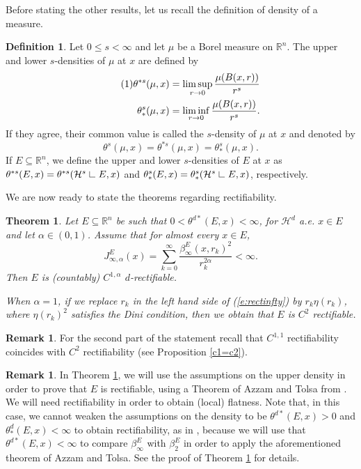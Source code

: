 \documentclass[11pt, twoside, leqno]{article}
\numberwithin{equation}{section}
\newcommand\numberthis{\addtocounter{equation}{1}\tag{\theequation}}
\theoremstyle{plain}
\newtheorem{thmz}{Theorem}
\theoremstyle{definition}
\newtheorem{rk}[thm]{Remark}
\newtheorem{defin}[thm]{Definition}
\newcommand{\R}{\mathbb{R}}
\newcommand{\res}{\hbox{ {\vrule height .22cm}{\leaders\hrule\hskip.2cm} }} %
\begin{document}
Before stating the other results, let us recall the definition of density of a measure. 
\begin{defin}
Let $0 \leq s < \infty$ and let $\mu$ be a Borel measure on $\R^n$. The upper and lower $s$-densities of $\mu$ at $x$ are defined by
\begin{align*} \numberthis
\theta^{*s}(\mu,x)& =\limsup_{r \to 0}\frac{\mu(B(x,r))}{r^s} \\
\theta_{*}^s(\mu,x) &=\liminf_{r \to 0}\frac{\mu(B(x,r))}{r^s}.
\end{align*}
If they agree, their common value is called the $s$-density of $\mu$ at $x$ and denoted by
\begin{equation}
    \theta^s(\mu,x)=\theta^{*s}(\mu,x)=\theta_{*}^s(\mu,x).
\end{equation}
If $E \subseteq \R^n$, we define the upper and lower $s$-densities of $E$ at $x$ as $\theta^{*s}(E,x)=\theta^{*s}(\mathcal{H}^s{\res E},x)$ and  $\theta^{s}_{*}(E,x)=\theta^{s}_{*}(\mathcal{H}^s{\res E},x)$, respectively.
\end{defin}
We are now ready to state the theorems regarding rectifiability. 

\begin{thmz} \label{rectinfty}
Let $E \subseteq \R^n$ be such that $0<\theta^{d*}(E,x)<\infty$, for $\mathcal{H}^d$ a.e. $x \in E$ and let $\alpha\in (0,1)$. Assume that for almost every $x \in E$,
\begin{equation} \label{e:rectinfty}
J^{E}_{\infty,\alpha}(x)=\sum_{k=0}^{\infty} \frac{\beta^E_{\infty}(x,r_k)^2}{r_k^{2\alpha}} < \infty.
\end{equation}
Then $E$ is (countably) $C^{1,\alpha}$ $d$-rectifiable.

When $\alpha=1$, if we replace $r_k$ in the left hand side of (\ref{e:rectinfty}) by $r_k\eta(r_k)$, where $\eta(r_k)^2$ satisfies the Dini condition, then we obtain that $E$ is $C^{2}$ rectifiable.
\end{thmz}

\begin{rk}
For the second part of the statement recall that $C^{1,1}$ rectifiability coincides with $C^2$ rectifiability (see Proposition \ref{c1=c2}).
\end{rk}

\begin{rk}
In Theorem \ref{rectinfty}, we will use the assumptions on the upper density in order to prove that $E$ is rectifiable, using a Theorem of Azzam and Tolsa from \cite{ATII}. We will need rectifiability in order to obtain (local) flatness. Note that, in this case, we cannot weaken the assumptions on the density to be $\theta^{d*}(E,x)>0$ and $\theta^d_*(E,x)<\infty$ to obtain rectifiability, as in \cite{naber}, because we will use that $\theta^{d*}(E,x)<\infty$ to compare $\beta_{\infty}^E$ with $\beta_2^E$ in order to apply the aforementioned theorem of Azzam and Tolsa. See the proof of Theorem \ref{rectinfty} for details.
\end{rk}
\end{document}
